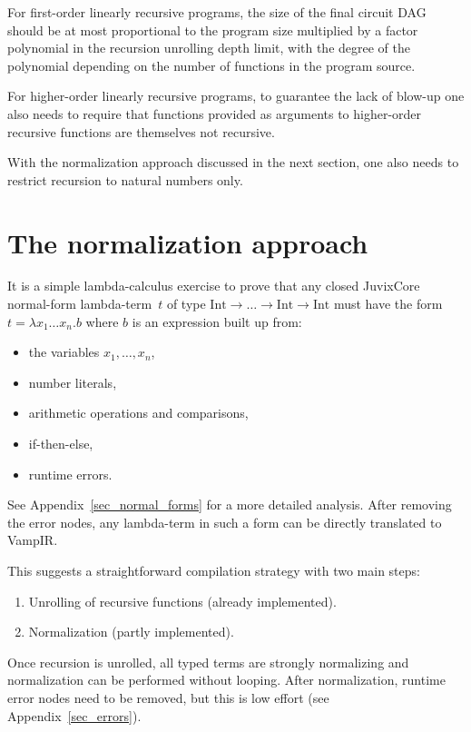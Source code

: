 For first-order linearly recursive programs, the size of the final
circuit DAG should be at most proportional to the program size
multiplied by a factor polynomial in the recursion unrolling depth
limit, with the degree of the polynomial depending on the number of
functions in the program source.

For higher-order linearly recursive programs, to guarantee the lack of
blow-up one also needs to require that functions provided as arguments
to higher-order recursive functions are themselves not recursive.

With the normalization approach discussed in the next section, one
also needs to restrict recursion to natural numbers only.

\section{The normalization approach}\label{sec_normalization}

It is a simple lambda-calculus exercise to prove that any closed
JuvixCore normal-form lambda-term~$t$ of type $\mathrm{Int} \to \ldots
\to \mathrm{Int} \to \mathrm{Int}$ must have the form $t = \lambda x_1
\ldots x_n . b$ where $b$ is an expression built up from:
\begin{itemize}
\item the variables $x_1,\ldots,x_n$,
\item number literals,
\item arithmetic operations and comparisons,
\item if-then-else,
\item runtime errors.
\end{itemize}
See Appendix~\ref{sec_normal_forms} for a more detailed
analysis. After removing the error nodes, any lambda-term in such a form
can be directly translated to VampIR.

This suggests a straightforward compilation strategy with two main
steps:
\begin{enumerate}
\item Unrolling of recursive functions (already implemented).
\item Normalization (partly implemented).
\end{enumerate}
Once recursion is unrolled, all typed terms are strongly normalizing
and normalization can be performed without looping. After
normalization, runtime error nodes need to be removed, but this is low
effort (see Appendix~\ref{sec_errors}).

